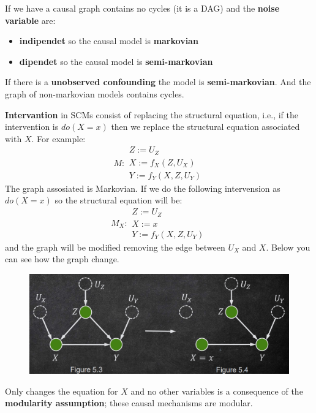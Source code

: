 If we have a causal graph contains no cycles (it is a DAG) and the \textbf{noise variable}
are:
\begin{itemize}
    \item \textbf{indipendet} so the causal model is \textbf{markovian}
    \item \textbf{dipendet} so the causal model is \textbf{semi-markovian}
\end{itemize}

\begin{note}
    If there is a \textbf{unobserved confounding} the model is \textbf{semi-markovian}. And
    the graph of non-markovian models contains cycles.
\end{note}

\textbf{Intervantion} in SCMs consist of replacing the structural equation, i.e., if the
intervention is $do(X = x)$ then we replace the structural equation associated with $X$.
For example:
\begin{equation}
    M : \begin{array}{l}
        Z := U_Z \\ X := f_X(Z, U_X) \\ Y:= f_Y(X, Z, U_Y)
    \end{array}
\end{equation}
The graph assosiated is Markovian. If we do the following intervension as $do(X=x)$
so the structural equation will be:
\begin{equation}
    M_X : \begin{array}{l}
        Z := U_Z \\ X := x \\ Y:= f_Y(X, Z, U_Y)
    \end{array}
\end{equation}
and the graph will be modified removing the edge between $U_X$ and $X$. Below you
can see how the graph change.


\begin{figure}[h]
    \centering
    \includegraphics*[width=0.5 \textwidth]{img/intervention_on_structural_eq.png}
\end{figure}

Only changes the equation for $X$ and no other variables is a consequence of the \textbf{modularity
    assumption}; these causal mechanisms are modular.

